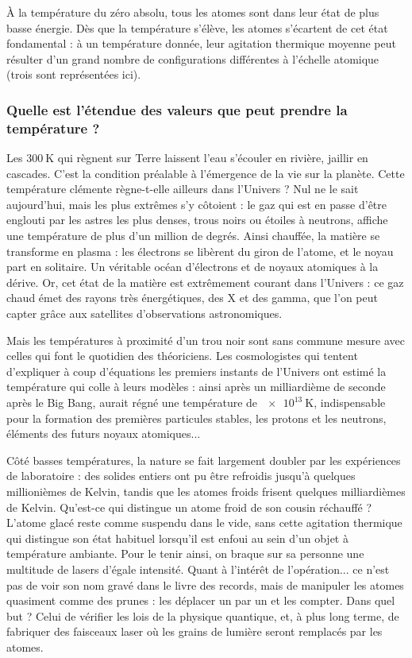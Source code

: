 À la température du zéro absolu, tous les atomes sont dans leur état de plus basse énergie. Dès que la température s'élève, les atomes s'écartent de cet état fondamental : à un température donnée, leur agitation thermique moyenne peut résulter d'un grand nombre de configurations différentes à l'échelle atomique (trois sont représentées ici).

\subsubsection{Quelle est l'étendue des valeurs que peut prendre la température ?}

Les \(\SI{300}{\kelvin}\) qui règnent sur Terre laissent l'eau s'écouler en rivière, jaillir en cascades. C'est la condition préalable à l'émergence de la vie sur la planète. Cette température clémente règne-t-elle ailleurs dans l'Univers ? Nul ne le sait aujourd'hui, mais les plus extrêmes s'y côtoient : le gaz qui est en passe d'être englouti par les astres les plus denses, trous noirs ou étoiles à neutrons, affiche une température de plus d'un million de degrés. Ainsi chauffée, la matière se transforme en plasma : les électrons se libèrent du giron de l'atome, et le noyau part en solitaire. Un véritable océan d'électrons et de noyaux atomiques à la dérive. Or, cet état de la matière est extrêmement courant dans l'Univers : ce gaz chaud émet des rayons très énergétiques, des X et des gamma, que l'on peut capter grâce aux satellites d'observations astronomiques.

Mais les températures à proximité d'un trou noir sont sans commune mesure avec celles qui font le quotidien des théoriciens. Les cosmologistes qui tentent d'expliquer à coup d'équations les premiers instants de l'Univers ont estimé la température qui colle à leurs modèles : ainsi après un milliardième de seconde après le Big Bang, aurait régné une température de \(\SI{e13}{\kelvin}\), indispensable pour la formation des premières particules stables, les protons et les neutrons, éléments des futurs noyaux atomiques...

Côté basses températures, la nature se fait largement doubler par les expériences de laboratoire : des solides entiers ont pu être refroidis jusqu'à quelques millionièmes de Kelvin, tandis que les atomes froids frisent quelques milliardièmes de Kelvin. Qu'est-ce qui distingue un atome froid de son cousin réchauffé ? L'atome glacé reste comme suspendu dans le vide, sans cette agitation thermique qui distingue son état habituel lorsqu'il est enfoui au sein d'un objet à température ambiante. Pour le tenir ainsi, on braque sur sa personne une multitude de lasers d'égale intensité. Quant à l'intérêt de l'opération... ce n'est pas de voir son nom gravé dans le livre des records, mais de manipuler les atomes quasiment comme des prunes : les déplacer un par un et les compter. Dans quel but ? Celui de vérifier les lois de la physique quantique, et, à plus long terme, de fabriquer des faisceaux laser où les grains de lumière seront remplacés par les atomes.

